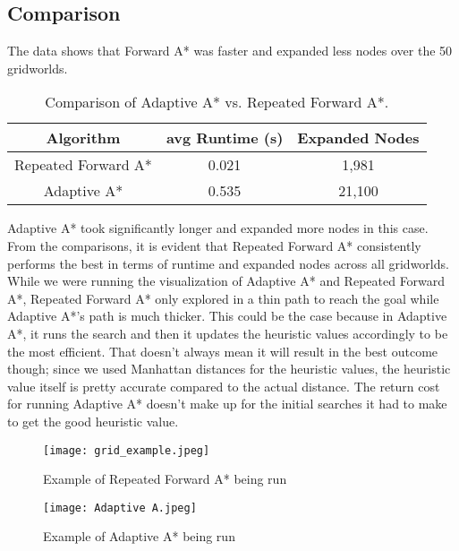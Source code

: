 \documentclass[12pt]{article}
\begin{document}
\subsection*{Comparison}
The data shows that Forward A* was faster and expanded less nodes over the 50 gridworlds.

\begin{table}[H]
\centering
\begin{tabular}{|c|c|c|}
\hline
\textbf{Algorithm} & \textbf{avg Runtime (s)} & \textbf{Expanded Nodes} \\
\hline
Repeated Forward A* & 0.021 & 1,981 \\
Adaptive A* & 0.535 & 21,100 \\
\hline
\end{tabular}
\caption{Comparison of Adaptive A* vs. Repeated Forward A*.}
\end{table}

Adaptive A* took significantly longer and expanded more nodes in this case.
From the comparisons, it is evident that Repeated Forward A* consistently performs the best in terms of runtime and expanded nodes across all gridworlds. While we were running the visualization of Adaptive A* and Repeated Forward A*, Repeated Forward A* only explored in a thin path to reach the goal while Adaptive A*'s path is much thicker. This could be the case because in Adaptive A*, it runs the search and then it updates the heuristic values accordingly to be the most efficient. That doesn't always mean it will result in the best outcome though; since we used Manhattan distances for the heuristic values, the heuristic value itself is pretty accurate compared to the actual distance. The return cost for running Adaptive A* doesn't make up for the initial searches it had to make to get the good heuristic value. 

\clearpage

\begin{figure}[H]
    \centering
    \texttt{[image: grid\_example.jpeg]}
    \caption{Example of Repeated Forward A* being run}
    \label{fig:grid-visualization}
\end{figure}

\begin{figure}
    \centering
    \texttt{[image: Adaptive A.jpeg]}
    \caption{Example of Adaptive A* being run}
    \label{fig:enter-label}
\end{figure}
\end{document}
